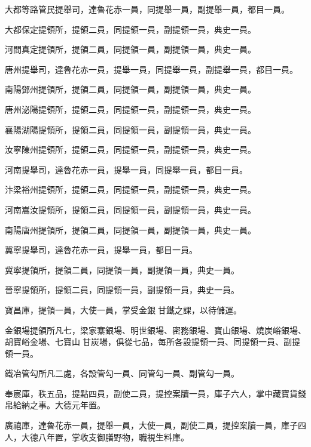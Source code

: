 \begin{pinyinscope}
 大都等路管民提舉司，達魯花赤一員，同提舉一員，副提舉一員，都目一員。



 大都保定提領所，提領二員，同提領一員，副提領一員，典史一員。



 河間真定提領所，提領二員，同提領一員，副提領一員，典史一員。



 唐州提舉司，達魯花赤一員，提舉一員，同提舉一員，副提舉一員，都目一員。



 南陽鄧州提領所，提領二員，同提領一員，副提領一員，典史一員。



 唐州泌陽提領所，提領二員，同提領一員，副提領一員，典史一員。



 襄陽湖陽提領所，提領二員，同提領一員，副提領一員，典史一員。



 汝寧陳州提領所，提領二員，同提領一員，副提領一員，典史一員。



 河南提舉司，達魯花赤一員，提舉一員，同提舉一員，都目一員。



 汴梁裕州提領所，提領二員，同提領一員，副提領一員，典史一員。



 河南嵩汝提領所，提領二員，同提領一員，副提領一員，典史一員。



 南陽唐州提領所，提領二員，同提領一員，副提領一員，典史一員。



 冀寧提舉司，達魯花赤一員，提舉一員，都目一員。



 冀寧提領所，提領二員，同提領一員，副提領一員，典史一員。



 晉寧提領所，提領二員，同提領一員，副提領一員，典史一員。



 寶昌庫，提領一員，大使一員，掌受金銀甘鐵之課，以待儲運。



 金銀場提領所凡七，梁家寨銀場、明世銀場、密務銀場、寶山銀場、燒炭峪銀場、胡寶峪金場、七寶山甘炭場，俱從七品，每所各設提領一員、同提領一員、副提領一員。



 鐵冶管勾所凡二處，各設管勾一員、同管勾一員、副管勾一員。



 奉宸庫，秩五品，提點四員，副使二員，提控案牘一員，庫子六人，掌中藏寶貨錢帛給納之事。大德元年置。



 廣禧庫，達魯花赤一員，提舉一員，大使一員，副使二員，提控案牘一員，庫子四人，大德八年置，掌收支御膳野物，職視生料庫。



\end{pinyinscope}